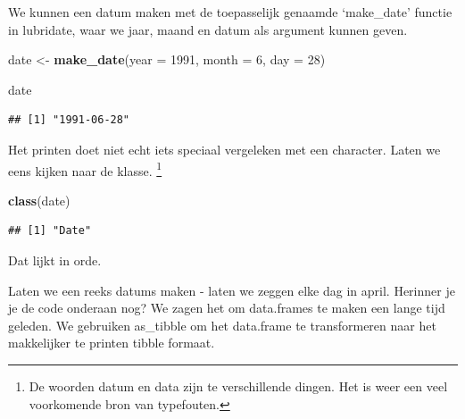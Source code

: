 \documentclass[]{tufte-book}
\newenvironment{Shaded}{}{}
\newcommand{\DataTypeTok}[1]{\textcolor[rgb]{0.56,0.13,0.00}{#1}}
\newcommand{\DecValTok}[1]{\textcolor[rgb]{0.25,0.63,0.44}{#1}}
\newcommand{\KeywordTok}[1]{\textcolor[rgb]{0.00,0.44,0.13}{\textbf{#1}}}
\newcommand{\NormalTok}[1]{#1}
\newcommand{\OperatorTok}[1]{\textcolor[rgb]{0.40,0.40,0.40}{#1}}
\newcommand{\StringTok}[1]{\textcolor[rgb]{0.25,0.44,0.63}{#1}}
\begin{document}
We kunnen een datum maken met de toepasselijk genaamde `make\_date' functie in lubridate, waar we jaar, maand en datum als argument kunnen geven.

\begin{Shaded}
\begin{Highlighting}[]
\NormalTok{date <-}\StringTok{ }\KeywordTok{make_date}\NormalTok{(}\DataTypeTok{year =} \DecValTok{1991}\NormalTok{, }\DataTypeTok{month =} \DecValTok{6}\NormalTok{, }\DataTypeTok{day =} \DecValTok{28}\NormalTok{)}
\end{Highlighting}
\end{Shaded}

\begin{Shaded}
\begin{Highlighting}[]
\NormalTok{date}
\end{Highlighting}
\end{Shaded}

\begin{verbatim}
## [1] "1991-06-28"
\end{verbatim}

Het printen doet niet echt iets speciaal vergeleken met een character. Laten we eens kijken naar de klasse. \footnote{De woorden datum en data zijn te verschillende dingen. Het is weer een veel voorkomende bron van typefouten.}

\begin{Shaded}
\begin{Highlighting}[]
\KeywordTok{class}\NormalTok{(date)}
\end{Highlighting}
\end{Shaded}

\begin{verbatim}
## [1] "Date"
\end{verbatim}

Dat lijkt in orde.

Laten we een reeks datums maken - laten we zeggen elke dag in april. Herinner je je de code onderaan nog? We zagen het om data.frames te maken een lange tijd geleden. We gebruiken as\_tibble om het data.frame te transformeren naar het makkelijker te printen tibble formaat.

\begin{Shaded}
\end{Shaded}
\end{document}
